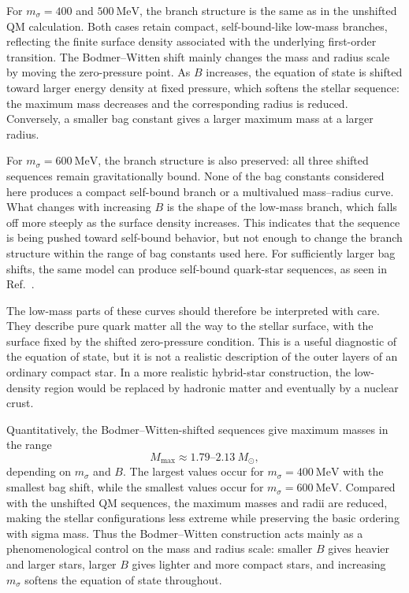 For \(m_\sigma = 400\) and \(500~\mathrm{MeV}\), the branch structure is the
same as in the unshifted QM calculation. Both cases retain compact,
self-bound-like low-mass branches, reflecting the finite surface
density associated with the underlying first-order transition. The
Bodmer--Witten shift mainly changes the mass and radius scale by moving
the zero-pressure point. As \(B\) increases, the equation of state is
shifted toward larger energy density at fixed pressure, which softens
the stellar sequence: the maximum mass decreases and the corresponding
radius is reduced. Conversely, a smaller bag constant gives a larger
maximum mass at a larger radius.

For \(m_\sigma = 600~\mathrm{MeV}\), the branch structure is also preserved:
all three shifted sequences remain gravitationally bound. None of the
bag constants considered here produces a compact self-bound branch or a
multivalued mass--radius curve. What changes with increasing \(B\) is
the shape of the low-mass branch, which falls off more steeply as the
surface density increases. This indicates that the sequence is being
pushed toward self-bound behavior, but not enough to change the branch
structure within the range of bag constants used here. For sufficiently larger
bag shifts, the same model can produce self-bound quark-star sequences,
as seen in Ref.~\cite{sletmoen2022}.

The low-mass parts of these curves should therefore be interpreted with
care. They describe pure quark matter all the way to the stellar surface,
with the surface fixed by the shifted zero-pressure condition. This is a
useful diagnostic of the equation of state, but it is not a realistic
description of the outer layers of an ordinary compact star. In a more
realistic hybrid-star construction, the low-density region would be
replaced by hadronic matter and eventually by a nuclear crust.

Quantitatively, the Bodmer--Witten-shifted sequences give maximum
masses in the range
\begin{equation}
M_{\max} \approx 1.79\text{--}2.13~M_\odot,
\end{equation}
depending on \(m_\sigma\) and \(B\). The largest values occur for
\(m_\sigma = 400~\mathrm{MeV}\) with the smallest bag shift, while the
smallest values occur for \(m_\sigma = 600~\mathrm{MeV}\). Compared with
the unshifted QM sequences, the maximum masses and radii are reduced,
making the stellar configurations less extreme while preserving the
basic ordering with sigma mass. Thus the Bodmer--Witten construction
acts mainly as a phenomenological control on the mass and radius scale:
smaller \(B\) gives heavier and larger stars, larger \(B\) gives lighter
and more compact stars, and increasing \(m_\sigma\) softens the equation
of state throughout.

